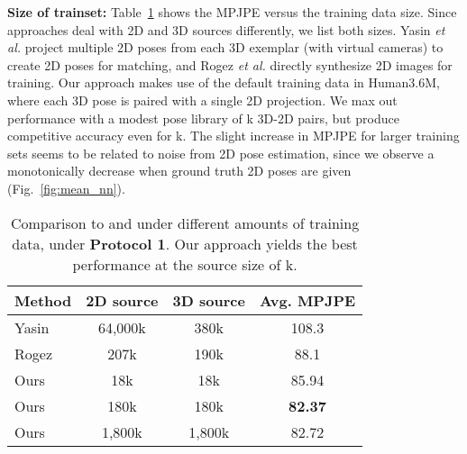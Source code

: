 \documentclass[10pt,twocolumn,letterpaper]{article}
\begin{document}
{\bf Size of trainset:} Table~\ref{table: train_size_compare} shows the MPJPE versus the training data size. Since approaches deal with 2D and 3D sources differently, we list both sizes. Yasin \textit{et al.} \cite{Yasin_2016_CVPR} project multiple 2D poses from each 3D exemplar (with virtual cameras) to create 2D poses for matching, and Rogez \textit{et al.} \cite{rogez2016mocap} directly synthesize 2D images for training. Our approach makes use of the default training data in Human3.6M, where each 3D pose is paired with a single 2D projection. We max out performance with a modest pose library of k 3D-2D pairs, but produce competitive accuracy even for k. The slight increase in MPJPE for larger training sets seems to be related to noise from 2D pose estimation, since we observe a monotonically decrease when ground truth 2D poses are given (Fig.~\ref{fig:mean_nn}).

\begin{table}[!]
\centering
\begin{tabular}{|l|c|c|c|}
\hline
Method & 2D source & 3D source & Avg. MPJPE\\
\hline
\hline
Yasin \cite{Yasin_2016_CVPR} & 64,000k & 380k & 108.3\\
Rogez \cite{rogez2016mocap}& 207k & 190k & 88.1 \\
\hline
Ours & 18k & 18k & 85.94\\
Ours & 180k & 180k & \textbf{82.37}\\
Ours & 1,800k & 1,800k & 82.72\\
\hline
\end{tabular}
\caption{Comparison to \cite{Yasin_2016_CVPR} and \cite{rogez2016mocap} under different amounts of training data, under {\bf Protocol 1}. Our approach yields the best performance at the source size of k.}
\label{table: train_size_compare}
\end{table}
\end{document}
